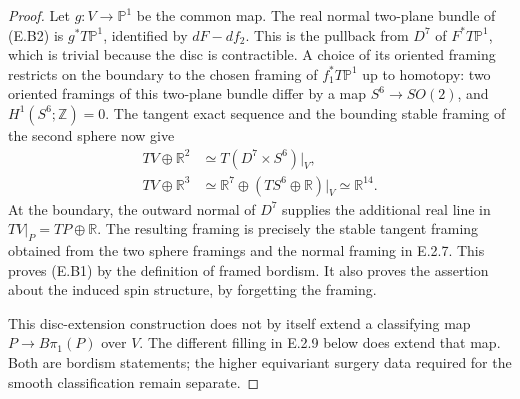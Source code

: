 \begin{proof}
Let $g:V\to\mathbb P^1$ be the common map. The real normal
two-plane bundle of (E.B2) is $g^*T\mathbb P^1$, identified by
$dF-df_2$. This is the pullback from $D^7$ of $F^*T\mathbb P^1$,
which is trivial because the disc is contractible. A choice of
its oriented framing restricts on the boundary to the chosen
framing of $f_1^*T\mathbb P^1$ up to homotopy: two oriented
framings of this two-plane bundle differ by a map
$S^6\to SO(2)$, and $H^1(S^6;\mathbb Z)=0$.
The tangent exact sequence and the bounding stable framing of
the second sphere now give
\[
 \begin{split}
 TV\oplus\mathbb R^2&\simeq
       T(D^7\times S^6)|_V,\\
 TV\oplus\mathbb R^3&\simeq
       \mathbb R^7\oplus(TS^6\oplus\mathbb R)|_V
       \simeq\mathbb R^{14}.
 \end{split}
\]
At the boundary, the outward normal of $D^7$ supplies the
additional real line in $TV|_P=TP\oplus\mathbb R$.
The resulting framing is precisely the stable tangent framing
obtained from the two sphere framings and the normal framing
in E.2.7. This proves (E.B1) by the definition of framed bordism.
It also proves the assertion about the induced spin structure,
by forgetting the framing.

This disc-extension construction does not by itself extend a
classifying map $P\to B\pi_1(P)$ over $V$.
The different filling in E.2.9 below does extend that map.
Both are bordism statements; the higher equivariant surgery
data required for the smooth classification remain separate.
\end{proof}
